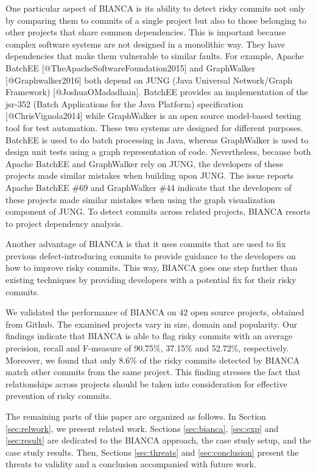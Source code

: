 One particular aspect of BIANCA is its ability to detect risky commits
not only by comparing them to commits of a single project but also to
those belonging to other projects that share common dependencies. This
is important because complex software systems are not designed in a
monolithic way. They have dependencies that make them vulnerable to
similar faults. For example, Apache BatchEE
{[}@TheApacheSoftwareFoundation2015{]} and GraphWalker
{[}@Graphwalker2016{]} both depend on JUNG (Java Universal Network/Graph
Framework) {[}@JoshuaOMadadhain{]}. BatchEE provides an implementation
of the jsr-352 (Batch Applications for the Java Platform) specification
{[}@ChrisVignola2014{]} while GraphWalker is an open source model-based
testing tool for test automation. These two systems are designed for
different purposes. BatchEE is used to do batch processing in Java,
whereas GraphWalker is used to design unit tests using a graph
representation of code. Nevertheless, because both Apache BatchEE and
GraphWalker rely on JUNG, the developers of these projects made similar
mistakes when building upon JUNG. The issue reports Apache BatchEE \#69
and GraphWalker \#44 indicate that the developers of these projects made
similar mistakes when using the graph visualization component of JUNG.
To detect commits across related projects, BIANCA resorts to project
dependency analysis.

Another advantage of BIANCA is that it uses commits that are used to fix
previous defect-introducing commits to provide guidance to the
developers on how to improve risky commits. This way, BIANCA goes one
step further than existing techniques by providing developers with a
potential fix for their risky commits.

We validated the performance of BIANCA on 42 open source projects,
obtained from Github. The examined projects vary in size, domain and
popularity. Our findings indicate that BIANCA is able to flag risky
commits with an average precision, recall and F-measure of 90.75\%,
37.15\% and 52.72\%, respectively. Moreover, we found that only 8.6\% of
the risky commits detected by BIANCA match other commits from the same
project. This finding stresses the fact that relationships across
projects should be taken into consideration for effective prevention of
risky commits.

The remaining parts of this paper are organized as follows. In Section
\ref{sec:relwork}, we present related work. Sections \ref{sec:bianca},
\ref{sec:exp} and \ref{sec:result} are dedicated to the BIANCA approach,
the case study setup, and the case study results. Then, Sections
\ref{sec:threats} and \ref{sec:conclusion} present the threats to
validity and a conclusion accompanied with future work.

